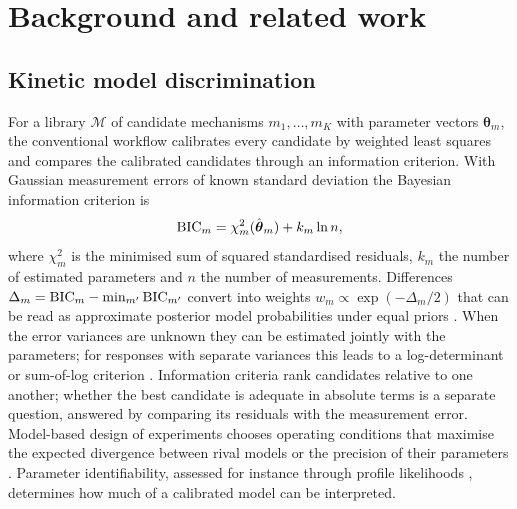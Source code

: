 \section{Background and related work}\label{sec:background}

\subsection{Kinetic model discrimination}
For a library $\mathcal{M}$ of candidate mechanisms $m_1,\dots,m_K$ with parameter vectors $\boldsymbol{\theta}_m$, the conventional workflow calibrates every candidate by weighted least squares and compares the calibrated candidates through an information criterion. With Gaussian measurement errors of known standard deviation the Bayesian information criterion is \citep{Schwarz1978}
\begin{equation}
\mathrm{BIC}_m = \chi^2_m(\hat{\boldsymbol{\theta}}_m) + k_m \ln n ,
\label{eq:bic_bg}
\end{equation}
where $\chi^2_m$ is the minimised sum of squared standardised residuals, $k_m$ the number of estimated parameters and $n$ the number of measurements. Differences $\Delta_m = \mathrm{BIC}_m - \min_{m'}\mathrm{BIC}_{m'}$ convert into weights $w_m \propto \exp(-\Delta_m/2)$ that can be read as approximate posterior model probabilities under equal priors \citep{Burnham2002}. When the error variances are unknown they can be estimated jointly with the parameters; for responses with separate variances this leads to a log-determinant or sum-of-log criterion \citep{BoxDraper1965,Bard1974}. Information criteria rank candidates relative to one another; whether the best candidate is adequate in absolute terms is a separate question, answered by comparing its residuals with the measurement error. Model-based design of experiments chooses operating conditions that maximise the expected divergence between rival models \citep{HunterReiner1965,BoxHill1967,BuzziFerraris1983} or the precision of their parameters \citep{Franceschini2008}. Parameter identifiability, assessed for instance through profile likelihoods \citep{Raue2009}, determines how much of a calibrated model can be interpreted.

